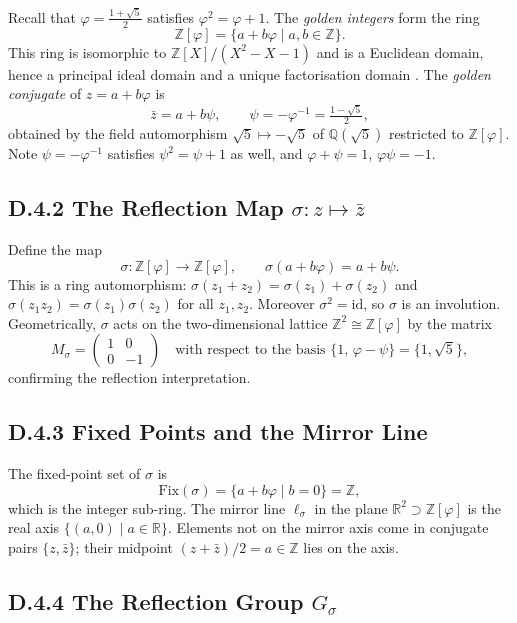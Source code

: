 Recall that $\varphi = \frac{1+\sqrt{5}}{2}$ satisfies $\varphi^2 = \varphi + 1$.
The \emph{golden integers} form the ring
\[
  \mathbb{Z}[\varphi] = \{a + b\varphi \mid a,b\in\mathbb{Z}\}.
\]
This ring is isomorphic to $\mathbb{Z}[X]/(X^2-X-1)$ and is a Euclidean domain,
hence a principal ideal domain and a unique factorisation domain
\cite{coxeter_regular_polytopes}.
The \emph{golden conjugate} of $z = a + b\varphi$ is
\[
  \bar{z} = a + b\psi, \qquad \psi = -\varphi^{-1} = \tfrac{1-\sqrt{5}}{2},
\]
obtained by the field automorphism $\sqrt{5} \mapsto -\sqrt{5}$ of
$\mathbb{Q}(\sqrt{5})$ restricted to $\mathbb{Z}[\varphi]$.
Note $\psi = -\varphi^{-1}$ satisfies $\psi^2 = \psi + 1$ as well, and
$\varphi + \psi = 1$, $\varphi\psi = -1$.

\subsection*{D.4.2  The Reflection Map $\sigma: z\mapsto \bar{z}$}

Define the map
\[
  \sigma: \mathbb{Z}[\varphi] \to \mathbb{Z}[\varphi], \qquad
  \sigma(a + b\varphi) = a + b\psi.
\]
This is a ring automorphism: $\sigma(z_1 + z_2) = \sigma(z_1) + \sigma(z_2)$
and $\sigma(z_1 z_2) = \sigma(z_1)\sigma(z_2)$ for all $z_1, z_2$.
Moreover $\sigma^2 = \mathrm{id}$, so $\sigma$ is an involution.
Geometrically, $\sigma$ acts on the two-dimensional lattice
$\mathbb{Z}^2 \cong \mathbb{Z}[\varphi]$ by the matrix
\[
  M_\sigma = \begin{pmatrix} 1 & 0 \\ 0 & -1 \end{pmatrix}
  \quad\text{with respect to the basis }\{1,\, \varphi-\psi\} = \{1,\sqrt{5}\},
\]
confirming the reflection interpretation.

\subsection*{D.4.3  Fixed Points and the Mirror Line}

The fixed-point set of $\sigma$ is
\[
  \mathrm{Fix}(\sigma) = \{a + b\varphi \mid b = 0\} = \mathbb{Z},
\]
which is the integer sub-ring.
The mirror line $\ell_\sigma$ in the plane $\mathbb{R}^2 \supset \mathbb{Z}[\varphi]$
is the real axis $\{(a, 0) \mid a\in\mathbb{R}\}$.
Elements not on the mirror axis come in conjugate pairs $\{z, \bar{z}\}$;
their midpoint $(z + \bar{z})/2 = a \in \mathbb{Z}$ lies on the axis.

\subsection*{D.4.4  The Reflection Group $G_\sigma$}

